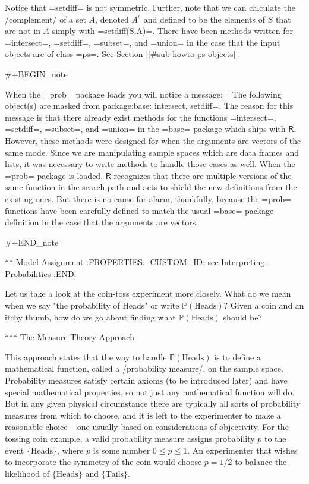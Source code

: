 Notice that =setdiff= is not symmetric. Further, note that we can
calculate the /complement/ of a set \(A\), denoted \(A^{c}\) and
defined to be the elements of \(S\) that are not in \(A\) simply with
=setdiff(S,A)=. There have been methods written for =intersect=,
=setdiff=, =subset=, and =union= in the case that the input objects
are of class =ps=. See Section [[#sub-howto-ps-objects]].

#+BEGIN_note

When the =prob= package \cite{prob} loads you will notice a message:
=The following object(s) are masked from package:base: intersect,
setdiff=. The reason for this message is that there already exist
methods for the functions =intersect=, =setdiff=, =subset=, and
=union= in the =base= package which ships with
\(\mathsf{R}\). However, these methods were designed for when the
arguments are vectors of the same mode. Since we are manipulating
sample spaces which are data frames and lists, it was necessary to
write methods to handle those cases as well. When the =prob= package
is loaded, \(\mathsf{R}\) recognizes that there are multiple versions
of the same function in the search path and acts to shield the new
definitions from the existing ones. But there is no cause for alarm,
thankfully, because the =prob= functions have been carefully defined
to match the usual =base= package definition in the case that the
arguments are vectors.

#+END_note

** Model Assignment
:PROPERTIES:
:CUSTOM_ID: sec-Interpreting-Probabilities
:END:

Let us take a look at the coin-toss experiment more closely. What do
we mean when we say "the probability of Heads" or write
\(\mathbb{P}(\mbox{Heads})\)? Given a coin and an itchy thumb, how do
we go about finding what \(\mathbb{P}(\mbox{Heads})\) should be?

*** The Measure Theory Approach

This approach states that the way to handle
\(\mathbb{P}(\mbox{Heads})\) is to define a mathematical function,
called a /probability measure/, on the sample space. Probability
measures satisfy certain axioms (to be introduced later) and have
special mathematical properties, so not just any mathematical function
will do. But in any given physical circumstance there are typically
all sorts of probability measures from which to choose, and it is left
to the experimenter to make a reasonable choice -- one usually based
on considerations of objectivity. For the tossing coin example, a
valid probability measure assigns probability \(p\) to the event \( \{
\mbox{Heads} \} \), where \(p\) is some number \(0\leq p\leq1\). An
experimenter that wishes to incorporate the symmetry of the coin would
choose \(p=1/2\) to balance the likelihood of \( \{\mbox{Heads} \} \)
and \( \{ \mbox{Tails} \} \).

